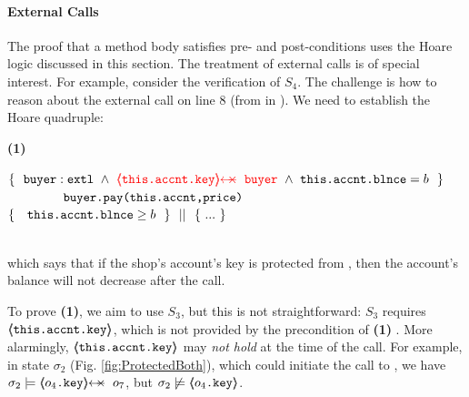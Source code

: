  
 \label{sec:howThird}
 
\paragraph{External Calls}  
The proof that a method body satisfies pre- and post-conditions uses the Hoare logic discussed in this section.
The treatment of external calls is of special interest. 
For example, consider  the  verification of $S_4$. 
The challenge is how to reason  about the external call on line 8 (from  in ). 
We need to establish the Hoare quadruple:

 \vspace{.05cm}
  \begin{minipage}{.05\textwidth}
   \textbf{(1)}\ \ 
\end{minipage}
\hfill
\begin{minipage}{.95\textwidth}
\begin{flushleft}
$\{\  \   \external{\prg{buyer}} \ \wedge\ 
 {\color{red} {\protectedFrom {\prg{this.\myAccount.key}}  {\prg{buyer} } }}
 \ \wedge\ \prg{this.\myAccount.\balance}= b  \ \  \}$\\
$\ \ \ \ \ \ \ \ \ \ \ \ {\ \mbox{\normalfont{\texttt{buyer.pay(this.accnt,price)}}}   \ } $\\
$  \{\  \ \  {\mbox{\normalfont{\texttt{this.\mbox{\normalfont{\texttt{accnt}}}.\mbox{\normalfont{\texttt{blnce}}}}}}} \geq  b \  \  \} \ \ ||\ \  \{ \ ... \ \} $ %
\end{flushleft}
\end{minipage}
\\
\noindent
which says that  if the shop's account's key is protected from , then the account's balance will not decrease after the call.

 \vspace{.1cm}
 
To prove \textbf{(1)}, we aim to use $S_3$, but this is not straightforward: %
 $S_3$  requires 
 {\color{red} {$\langle\!\!\langle \mbox{\normalfont{\texttt{this.\mbox{\normalfont{\texttt{accnt}}}.key}}} \rangle\!\!\rangle$}}, 
 which is not provided by the precondition of \textbf{(1)} .
 More alarmingly,  
$\langle\!\!\langle \mbox{\normalfont{\texttt{this.\mbox{\normalfont{\texttt{accnt}}}.key}}} \rangle\!\!\rangle$ may \emph{not hold} at the time of the call.
%
For example, in state $\sigma_2$ (Fig. \ref{fig:ProtectedBoth}), which could initiate the call to , we have $\sigma_2 \models \protectedFrom{o_4\prg{.key}} {o_7}$, but $\sigma_2 \not\models \langle\!\!\langle o_4\mbox{\normalfont{\texttt{.key}}} \rangle\!\!\rangle$.

